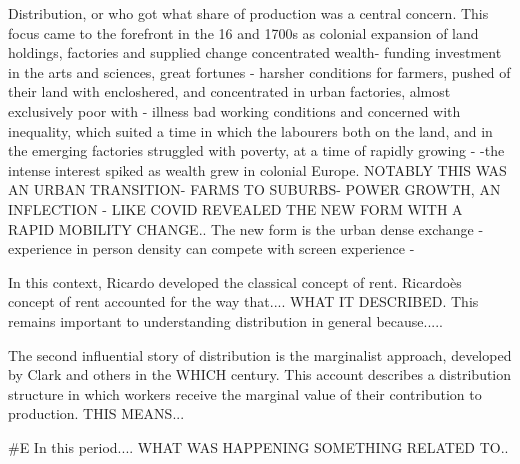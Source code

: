 Distribution, or who got what share of production was a central concern. This focus came to the forefront in the 16 and 1700s as colonial expansion of land holdings, factories and supplied change concentrated wealth- funding investment in the arts and sciences, great fortunes - harsher conditions for farmers, pushed of their land with encloshered, and concentrated in urban factories, almost exclusively poor with - illness bad working conditions %
 and concerned with inequality, which suited a time in which the labourers both on the land, and in the emerging factories struggled with poverty, at a time of rapidly growing -
-the intense interest spiked as wealth grew in colonial Europe. %
NOTABLY THIS WAS AN URBAN TRANSITION- FARMS TO SUBURBS- POWER GROWTH, AN INFLECTION - LIKE COVID REVEALED THE NEW FORM WITH A RAPID MOBILITY CHANGE..
The new form is the urban
dense exchange - experience in person density can compete with screen experience -

In this context, Ricardo developed the classical concept of rent.  %
Ricardoès concept of rent accounted for the way that.... WHAT IT DESCRIBED. 
This remains important to understanding distribution in general because.....

The second influential story of distribution is the marginalist approach, developed by Clark and others in the WHICH century. This account describes a distribution structure in which workers receive the marginal value of their contribution to production. THIS MEANS...

#E In this period.... WHAT WAS HAPPENING SOMETHING RELATED TO.. %

